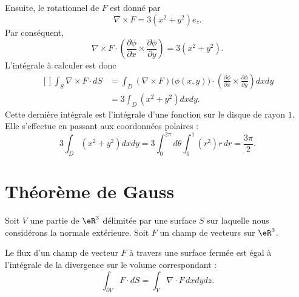 \begin{example}
	Ensuite, le rotationnel de \( F\) est donné par
	\begin{equation}
		\nabla\times F=3(x^2+y^2)e_z.
	\end{equation}
	Par conséquent,
	\begin{equation}
		\nabla\times F\cdot\left( \frac{ \partial \phi }{ \partial x }\times\frac{ \partial \phi }{ \partial y } \right)=3(x^2+y^2).
	\end{equation}
	L'intégrale à calculer est donc
	\begin{equation}
		\begin{aligned}[]
			\int_S\nabla\times F\cdot dS & =\int_D(\nabla\times F)\big( \phi(x,y) \big)\cdot\left( \frac{ \partial \phi }{ \partial x }\times\frac{ \partial \phi }{ \partial y } \right)dxdy \\
			                             & =3\int_D(x^2+y^2)dxdy.
		\end{aligned}
	\end{equation}
	Cette dernière intégrale est l'intégrale d'une fonction sur le disque de rayon \( 1\). Elle s'effectue en passant aux coordonnées polaires :
	\begin{equation}
		3\int_D(x^2+y^2)dxdy=3\int_0^{2\pi}d\theta\int_0^1(r^2)r\,dr=\frac{ 3\pi }{2}.
	\end{equation}
\end{example}

\section{Théorème de Gauss}

Soit \( V\) une partie de \( \eR^3\) délimitée par une surface \( S\) sur laquelle nous considérons la normale extérieure. Soit \( F\) un champ de vecteurs sur \( \eR^3\).

\begin{theorem}
	Le flux d'un champ de vecteur \( F\) à travers une surface fermée est égal à l'intégrale de la divergence sur le volume correspondant :
	\begin{equation}
		\int_{\partial V} F\cdot dS=\int_V\nabla\cdot F\,dxdydz.
	\end{equation}
\end{theorem}

